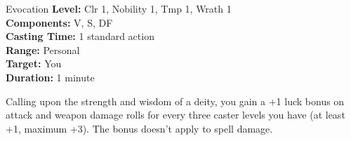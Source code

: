 {Evocation}
{
	\textbf{Level:}
	Clr 1, Nobility 1, Tmp 1, Wrath 1\\
	\textbf{Components:}
	V, S, DF\\
	\textbf{Casting Time:}
	1 standard action\\
	\textbf{Range:}
	Personal\\
	\textbf{Target:}
	You\\
	\textbf{Duration:}
	1 minute\\
}
{
	Calling upon the strength and wisdom of a deity, you gain a +1 luck bonus on attack and weapon damage rolls for every three caster levels you have (at least +1, maximum +3). The bonus doesn't apply to spell damage.

}

